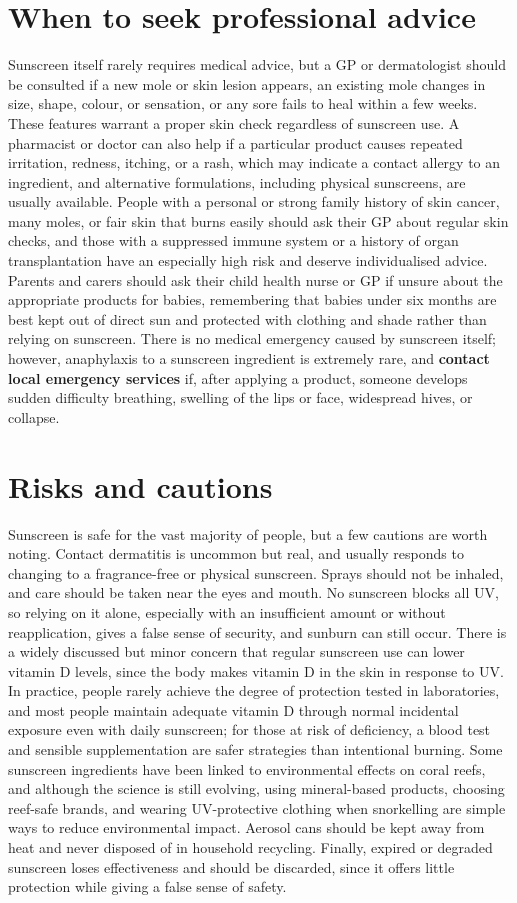 \section*{When to seek professional advice}
Sunscreen itself rarely requires medical advice, but a GP or dermatologist should be consulted if a new mole or skin lesion appears, an existing mole changes in size, shape, colour, or sensation, or any sore fails to heal within a few weeks. These features warrant a proper skin check regardless of sunscreen use. A pharmacist or doctor can also help if a particular product causes repeated irritation, redness, itching, or a rash, which may indicate a contact allergy to an ingredient, and alternative formulations, including physical sunscreens, are usually available. People with a personal or strong family history of skin cancer, many moles, or fair skin that burns easily should ask their GP about regular skin checks, and those with a suppressed immune system or a history of organ transplantation have an especially high risk and deserve individualised advice. Parents and carers should ask their child health nurse or GP if unsure about the appropriate products for babies, remembering that babies under six months are best kept out of direct sun and protected with clothing and shade rather than relying on sunscreen. There is no medical emergency caused by sunscreen itself; however, anaphylaxis to a sunscreen ingredient is extremely rare, and \textbf{contact local emergency services} if, after applying a product, someone develops sudden difficulty breathing, swelling of the lips or face, widespread hives, or collapse.

\section*{Risks and cautions}
Sunscreen is safe for the vast majority of people, but a few cautions are worth noting. Contact dermatitis is uncommon but real, and usually responds to changing to a fragrance-free or physical sunscreen. Sprays should not be inhaled, and care should be taken near the eyes and mouth. No sunscreen blocks all UV, so relying on it alone, especially with an insufficient amount or without reapplication, gives a false sense of security, and sunburn can still occur. There is a widely discussed but minor concern that regular sunscreen use can lower vitamin D levels, since the body makes vitamin D in the skin in response to UV. In practice, people rarely achieve the degree of protection tested in laboratories, and most people maintain adequate vitamin D through normal incidental exposure even with daily sunscreen; for those at risk of deficiency, a blood test and sensible supplementation are safer strategies than intentional burning. Some sunscreen ingredients have been linked to environmental effects on coral reefs, and although the science is still evolving, using mineral-based products, choosing reef-safe brands, and wearing UV-protective clothing when snorkelling are simple ways to reduce environmental impact. Aerosol cans should be kept away from heat and never disposed of in household recycling. Finally, expired or degraded sunscreen loses effectiveness and should be discarded, since it offers little protection while giving a false sense of safety.

